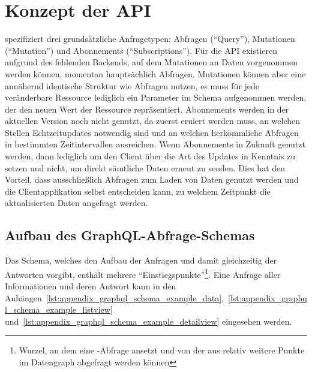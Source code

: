 \section{Konzept der API}
 spezifiziert drei grundsätzliche Anfragetypen: Abfragen (\enquote{Query}), Mutationen (\enquote{Mutation}) und Abonnements (\enquote{Subscriptions}). Für die API existieren aufgrund des fehlenden Backends, auf dem Mutationen an Daten vorgenommen werden können, momentan hauptsächlich Abfragen. Mutationen können aber eine annähernd identische Struktur wie Abfragen nutzen, es muss für jede veränderbare Ressource lediglich ein Parameter im Schema aufgenommen werden, der den neuen Wert der Ressource repräsentiert. Abonnements werden in der aktuellen Version noch nicht genutzt, da zuerst eruiert werden muss, an welchen Stellen Echtzeitupdates notwendig sind und an welchen herkömmliche Abfragen in bestimmten Zeitintervallen ausreichen. Wenn Abonnements in Zukunft genutzt werden, dann lediglich um den Client über die Art des Updates in Kenntnis zu setzen und nicht, um direkt sämtliche Daten erneut zu senden. Dies hat den Vorteil, dass ausschließlich Abfragen zum Laden von Daten genutzt werden und die Clientapplikation selbst entscheiden kann, zu welchem Zeitpunkt die aktualisierten Daten angefragt werden.

\subsection{Aufbau des GraphQL-Abfrage-Schemas}\label{subsec:graphql_schema}
Das Schema, welches den Aufbau der Anfragen und damit gleichzeitig der Antworten vorgibt, enthält mehrere \enquote{Einstiegspunkte}\footnote{Wurzel, an dem eine -Abfrage ansetzt und von der aus relativ weitere Punkte im Datengraph abgefragt werden können}. Eine Anfrage aller Informationen und deren Antwort kann in den Anhängen~\ref{lst:appendix_graphql_schema_example_data},~\ref{lst:appendix_graphql_schema_example_listview} und~\ref{lst:appendix_graphql_schema_example_detailview} eingesehen werden.

